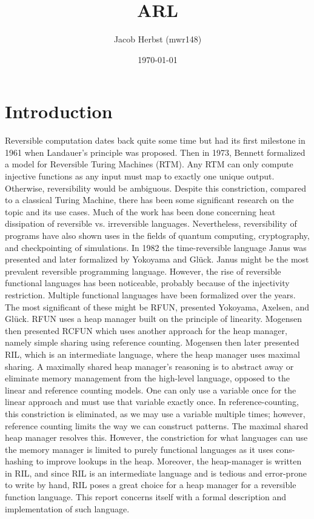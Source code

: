 \documentclass[a4paper]{article}
\author{Jacob Herbst (mwr148)}
\date{\today}
\title{ARL}
\begin{document}
\maketitle
\tableofcontents

\newpage
\section{Introduction}
\label{intro}
Reversible computation dates back quite some time but had its first milestone in 1961 when Landauer's principle was proposed\cite{L61}. Then in 1973, Bennett\cite{B73} formalized a model for Reversible Turing Machines (RTM). Any RTM can only compute injective functions as any input must map to exactly one unique output. Otherwise, reversibility would be ambiguous. Despite this constriction, compared to a classical Turing Machine, there has been some significant research on the topic and its use cases. Much of the work has been done concerning heat dissipation of reversible vs. irreversible languages. Nevertheless, reversibility of programs have also shown uses in the fields of quantum computing, cryptography, and checkpointing of simulations\cite{Schordan2020}. In 1982 the time-reversible language Janus was presented and later formalized by Yokoyama and Glück\cite{janus}. Janus might be the most prevalent reversible programming language. However, the rise of reversible functional languages has been noticeable, probably because of the injectivity restriction. Multiple functional languages have been formalized over the years. The most significant of these might be RFUN, presented Yokoyama, Axelsen, and Glück\cite{YokoyamaAxelsenGluck:2011}. RFUN uses a heap manager built on the principle of linearity. Mogensen then presented RCFUN\cite{Mogensen:RC2014} which uses another approach for the heap manager, namely simple sharing using reference counting. Mogensen then later presented RIL, which is an intermediate language, where the heap manager uses maximal sharing\cite{Mogensen2018ReversibleGC}. A maximally shared heap manager's reasoning is to abstract away or eliminate memory management from the high-level language, opposed to the linear and reference counting models. One can only use a variable once for the linear approach and must use that variable exactly once. In reference-counting, this constriction is eliminated, as we may use a variable multiple times; however, reference counting limits the way we can construct patterns. The maximal shared heap manager resolves this. However, the constriction for what languages can use the memory manager is limited to purely functional languages as it uses cons-hashing to improve lookups in the heap. Moreover, the heap-manager is written in RIL, and since RIL is an intermediate language and is tedious and error-prone to write by hand, RIL poses a great choice for a heap manager for a reversible function language. This report concerns itself with a formal description and implementation of such language.
\end{document}
